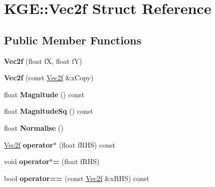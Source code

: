 \hypertarget{struct_k_g_e_1_1_vec2f}{\section{K\-G\-E\-:\-:Vec2f Struct Reference}
\label{struct_k_g_e_1_1_vec2f}
}
\subsection*{Public Member Functions}
\begin{DoxyCompactItemize}
\item 
\hypertarget{struct_k_g_e_1_1_vec2f_a295c1fd5d8a1206e189eb56180fa2720}{{\bfseries Vec2f} (float f\-X, float f\-Y)}\label{struct_k_g_e_1_1_vec2f_a295c1fd5d8a1206e189eb56180fa2720}

\item 
\hypertarget{struct_k_g_e_1_1_vec2f_a79a4eb6d91c80cb3d692845f9abb5918}{{\bfseries Vec2f} (const \hyperlink{struct_k_g_e_1_1_vec2f}{Vec2f} \&x\-Copy)}\label{struct_k_g_e_1_1_vec2f_a79a4eb6d91c80cb3d692845f9abb5918}

\item 
\hypertarget{struct_k_g_e_1_1_vec2f_a62bdfd01997b7c2175cc23804e468743}{float {\bfseries Magnitude} () const }\label{struct_k_g_e_1_1_vec2f_a62bdfd01997b7c2175cc23804e468743}

\item 
\hypertarget{struct_k_g_e_1_1_vec2f_a704881b909c4a6f32926db57acc0c063}{float {\bfseries Magnitude\-Sq} () const }\label{struct_k_g_e_1_1_vec2f_a704881b909c4a6f32926db57acc0c063}

\item 
\hypertarget{struct_k_g_e_1_1_vec2f_ae7ab2bd76a369c8293a419fc8983c5c4}{float {\bfseries Normalise} ()}\label{struct_k_g_e_1_1_vec2f_ae7ab2bd76a369c8293a419fc8983c5c4}

\item 
\hypertarget{struct_k_g_e_1_1_vec2f_a1eccb56f05d77248d59ed17684b7e73b}{\hyperlink{struct_k_g_e_1_1_vec2f}{Vec2f} {\bfseries operator$\ast$} (float f\-R\-H\-S) const }\label{struct_k_g_e_1_1_vec2f_a1eccb56f05d77248d59ed17684b7e73b}

\item 
\hypertarget{struct_k_g_e_1_1_vec2f_adeb44e2cba0f80008351ebcbd4fc2b82}{void {\bfseries operator$\ast$=} (float f\-R\-H\-S)}\label{struct_k_g_e_1_1_vec2f_adeb44e2cba0f80008351ebcbd4fc2b82}

\item 
\hypertarget{struct_k_g_e_1_1_vec2f_a0035decd7d54ed75f96bb08d56371acc}{bool {\bfseries operator==} (const \hyperlink{struct_k_g_e_1_1_vec2f}{Vec2f} \&x\-R\-H\-S) const }\label{struct_k_g_e_1_1_vec2f_a0035decd7d54ed75f96bb08d56371acc}


\end{DoxyCompactItemize}
